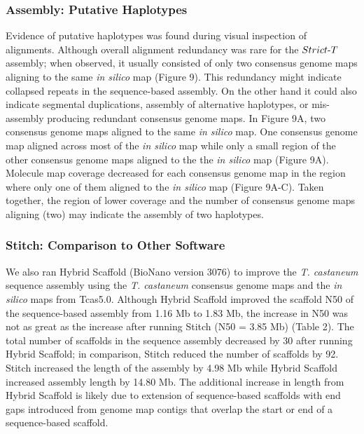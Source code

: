 \documentclass{bmcart}
\begin{document}
\subsubsection*{Assembly: Putative Haplotypes}

Evidence of putative haplotypes was found during visual inspection of alignments. Although overall alignment redundancy was rare for the $Strict\textnormal{-}T$ assembly; when observed, it usually consisted of only two consensus genome maps aligning to the same \textit{in silico} map (Figure 9). This redundancy might indicate collapsed repeats in the sequence-based assembly. On the other hand it could also indicate segmental duplications, assembly of alternative haplotypes, or mis-assembly producing redundant consensus genome maps. In Figure 9A, two consensus genome maps aligned to the same \textit{in silico} map. One consensus genome map aligned across most of the \textit{in silico} map while only a small region of the other consensus genome maps aligned to the the \textit{in silico} map (Figure 9A). Molecule map coverage decreased for each consensus genome map in the region where only one of them aligned to the \textit{in silico} map (Figure 9A-C). Taken together, the region of lower coverage and the number of consensus genome maps aligning (two) may indicate the assembly of two haplotypes. 

\subsubsection*{Stitch: Comparison to Other Software}

We also ran Hybrid Scaffold (BioNano version 3076) to improve the \textit{T. castaneum} sequence assembly using the \textit{T. castaneum} consensus genome maps and the \textit{in silico} maps from Tcas5.0. Although Hybrid Scaffold improved the scaffold N50 of the sequence-based assembly from 1.16 Mb to 1.83 Mb, the increase in N50 was not as great as the increase after running Stitch (N50 = 3.85 Mb) (Table 2). The total number of scaffolds in the sequence assembly decreased by 30 after running Hybrid Scaffold; in comparison, Stitch reduced the number of scaffolds by 92. Stitch increased the length of the assembly by 4.98 Mb while Hybrid Scaffold increased assembly length by 14.80 Mb. The additional increase in length from Hybrid Scaffold is likely due to extension of sequence-based scaffolds with end gaps introduced from genome map contigs that overlap the start or end of a sequence-based scaffold. 
\end{document}
